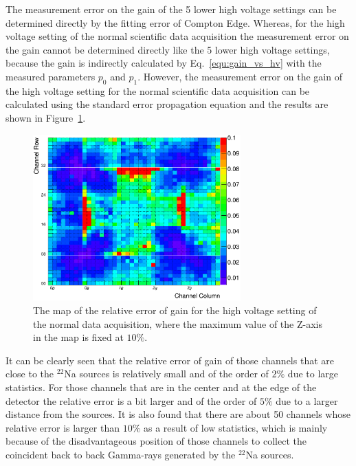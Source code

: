 \documentclass[preprint,sort&compress,12pt]{elsarticle}
\begin{document}
\newpage

The measurement error on the gain of the 5 lower high voltage settings can be determined directly by the fitting error of Compton Edge. Whereas, for the high voltage setting of the normal scientific data acquisition the measurement error on the gain cannot be determined directly like the 5 lower high voltage settings, because the gain is indirectly calculated by Eq.~\eqref{equ:gain_vs_hv} with the measured parameters $p_0$ and $p_1$. However, the measurement error on the gain of the high voltage setting for the normal scientific data acquisition can be calculated using the standard error propagation equation and the results are shown in Figure~\ref{fig:error_of_gain}.

\begin{figure}[!ht]
\centering
\includegraphics[width=8cm]{images/gain_error_map_bank50.png}
\caption{The map of the relative error of gain for the high voltage setting of the normal data acquisition, where the maximum value of the Z-axis in the map is fixed at $10\%$.}\label{fig:error_of_gain}
\end{figure}

It can be clearly seen that the relative error of gain of those channels that are close to the $^{22}$Na sources is relatively small and of the order of $2\%$ due to large statistics. For those channels that are in the center and at the edge of the detector the relative error is a bit larger and of the order of $5\%$ due to a larger distance from the sources. It is also found that there are about 50 channels whose relative error is larger than $10\%$ as a result of low statistics, which is mainly because of the disadvantageous position of those channels to collect the coincident back to back Gamma-rays generated by the $^{22}$Na sources.

\newpage
\end{document}
